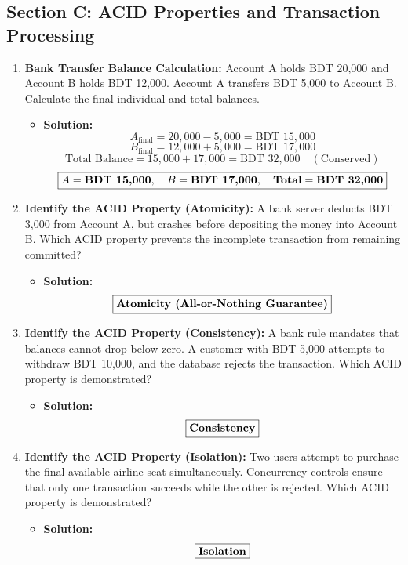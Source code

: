 \subsection{Section C: ACID Properties and Transaction Processing}

\begin{enumerate}[label=\textbf{Problem \arabic*.,resume},leftmargin=1.5cm]
\item \textbf{Bank Transfer Balance Calculation:}
Account A holds BDT 20,000 and Account B holds BDT 12,000. Account A transfers BDT 5,000 to Account B. Calculate the final individual and total balances.
\begin{itemize}
\item \textbf{Solution:}
\[ A_{\text{final}} = 20,000 - 5,000 = \text{BDT } 15,000 \]
\[ B_{\text{final}} = 12,000 + 5,000 = \text{BDT } 17,000 \]
\[ \text{Total Balance} = 15,000 + 17,000 = \text{BDT } 32,000 \quad (\text{Conserved}) \]
\[ \boxed{A = \text{\textbf{BDT 15,000}}, \quad B = \text{\textbf{BDT 17,000}}, \quad \text{\textbf{Total}} = \text{\textbf{BDT 32,000}}} \]
\end{itemize}

\item \textbf{Identify the ACID Property (Atomicity):}
A bank server deducts BDT 3,000 from Account A, but crashes before depositing the money into Account B. Which ACID property prevents the incomplete transaction from remaining committed?
\begin{itemize}
\item \textbf{Solution:}
\[ \boxed{\text{\textbf{Atomicity (All-or-Nothing Guarantee)}}} \]
\end{itemize}

\item \textbf{Identify the ACID Property (Consistency):}
A bank rule mandates that balances cannot drop below zero. A customer with BDT 5,000 attempts to withdraw BDT 10,000, and the database rejects the transaction. Which ACID property is demonstrated?
\begin{itemize}
\item \textbf{Solution:}
\[ \boxed{\text{\textbf{Consistency}}} \]
\end{itemize}

\item \textbf{Identify the ACID Property (Isolation):}
Two users attempt to purchase the final available airline seat simultaneously. Concurrency controls ensure that only one transaction succeeds while the other is rejected. Which ACID property is demonstrated?
\begin{itemize}
\item \textbf{Solution:}
\[ \boxed{\text{\textbf{Isolation}}} \]
\end{itemize}


\end{enumerate}
